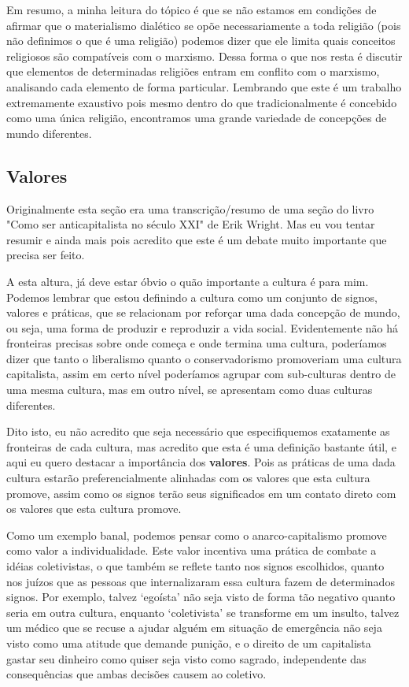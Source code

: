 Em resumo, a minha leitura do tópico é que se não estamos em condições de afirmar que o materialismo dialético se opõe necessariamente a toda religião (pois não definimos o que é uma religião) podemos dizer que ele limita quais conceitos religiosos são compatíveis com o marxismo. Dessa forma o que nos resta é discutir que elementos de determinadas religiões entram em conflito com o marxismo, analisando cada elemento de forma particular. Lembrando que este é um trabalho extremamente exaustivo pois mesmo dentro do que tradicionalmente é concebido como uma única religião, encontramos uma grande variedade de concepções de mundo diferentes.

\subsection{Valores}

Originalmente esta seção era uma transcrição/resumo de uma seção do livro "Como ser anticapitalista no século XXI" de Erik Wright. Mas eu vou tentar resumir e ainda mais pois acredito que este é um debate muito importante que precisa ser feito.

A esta altura, já deve estar óbvio o quão importante a cultura é para mim. Podemos lembrar que estou definindo a cultura como um conjunto de signos, valores e práticas, que se relacionam por reforçar uma dada concepção de mundo, ou seja, uma forma de produzir e reproduzir a vida social. Evidentemente não há fronteiras precisas sobre onde começa e onde termina uma cultura, poderíamos dizer que tanto o liberalismo quanto o conservadorismo promoveriam uma cultura capitalista, assim em certo nível poderíamos agrupar com sub-culturas dentro de uma mesma cultura, mas em outro nível, se apresentam como duas culturas diferentes.

Dito isto, eu não acredito que seja necessário que especifiquemos exatamente as fronteiras de cada cultura, mas acredito que esta é uma definição bastante útil, e aqui eu quero destacar a importância dos \textbf{valores}. Pois as práticas de uma dada cultura estarão preferencialmente alinhadas com os valores que esta cultura promove, assim como os signos terão seus significados em um contato direto com os valores que esta cultura promove.

Como um exemplo banal, podemos pensar como o anarco-capitalismo promove como valor a individualidade. Este valor incentiva uma prática de combate a idéias coletivistas, o que também se reflete tanto nos signos escolhidos, quanto nos juízos que as pessoas que internalizaram essa cultura fazem de determinados signos. Por exemplo, talvez ‘egoísta’ não seja visto de forma tão negativo quanto seria em outra cultura, enquanto ‘coletivista’ se transforme em um insulto, talvez um médico que se recuse a ajudar alguém em situação de emergência não seja visto como uma atitude que demande punição, e o direito de um capitalista gastar seu dinheiro como quiser seja visto como sagrado, independente das consequências que ambas decisões causem ao coletivo.

